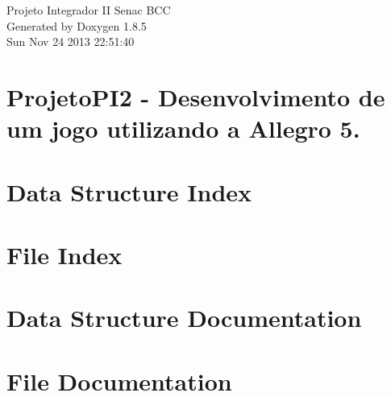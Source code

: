 \documentclass[twoside]{book}
\newcommand{\clearemptydoublepage}{%
  \newpage{\pagestyle{empty}\cleardoublepage}%
}
\begin{document}
\hypersetup{pageanchor=false}
\begin{titlepage}
\vspace*{7cm}
\begin{center}%
{\Large Projeto Integrador I\-I Senac B\-C\-C }\\
\vspace*{1cm}
{\large Generated by Doxygen 1.8.5}\\
\vspace*{0.5cm}
{\small Sun Nov 24 2013 22:51:40}\\
\end{center}
\end{titlepage}
\clearemptydoublepage
\tableofcontents
\clearemptydoublepage
{}
\hypersetup{pageanchor=true}

\chapter{Projeto\-P\-I2 -\/ Desenvolvimento de um jogo utilizando a Allegro 5.}
\label{md__j_1__s_e_n_a_c__logi_kid__r_e_a_d_m_e}
\hypertarget{md__j_1__s_e_n_a_c__logi_kid__r_e_a_d_m_e}{}

\chapter{Data Structure Index}

\chapter{File Index}

\chapter{Data Structure Documentation}

















\chapter{File Documentation}

































\newpage
{}
{}
\printindex
\end{document}
